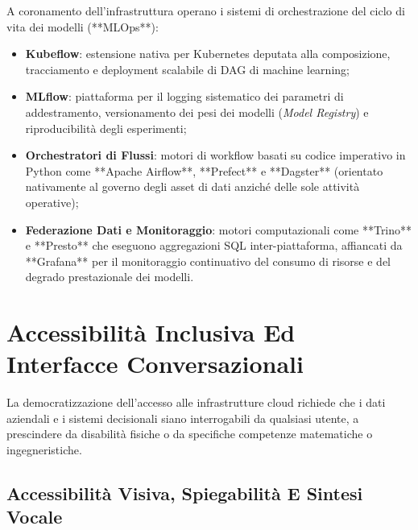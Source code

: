 \documentclass[11pt, a4paper]{article}
\begin{document}
A coronamento dell'infrastruttura operano i sistemi di orchestrazione del ciclo di vita dei modelli (**MLOps**):
\begin{itemize}
    \item \textbf{Kubeflow}: estensione nativa per Kubernetes deputata alla composizione, tracciamento e deployment scalabile di DAG di machine learning;
    \item \textbf{MLflow}: piattaforma per il logging sistematico dei parametri di addestramento, versionamento dei pesi dei modelli (\emph{Model Registry}) e riproducibilità degli esperimenti;
    \item \textbf{Orchestratori di Flussi}: motori di workflow basati su codice imperativo in Python come **Apache Airflow**, **Prefect** e **Dagster** (orientato nativamente al governo degli asset di dati anziché delle sole attività operative);
    \item \textbf{Federazione Dati e Monitoraggio}: motori computazionali come **Trino** e **Presto** che eseguono aggregazioni SQL inter-piattaforma, affiancati da **Grafana** per il monitoraggio continuativo del consumo di risorse e del degrado prestazionale dei modelli.
\end{itemize}

\newpage


\section{Accessibilità Inclusiva Ed Interfacce Conversazionali}

La democratizzazione dell'accesso alle infrastrutture cloud richiede che i dati aziendali e i sistemi decisionali siano interrogabili da qualsiasi utente, a prescindere da disabilità fisiche o da specifiche competenze matematiche o ingegneristiche.



\subsection{Accessibilità Visiva, Spiegabilità E Sintesi Vocale}
\end{document}
